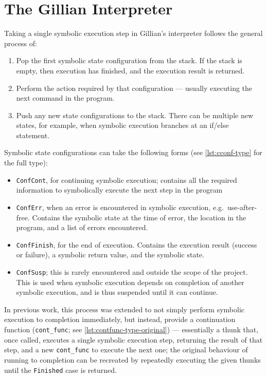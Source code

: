 \section{The Gillian Interpreter}\label{sec:current:interpreter}

Taking a single symbolic execution step in Gillian's interpreter follows the
general process of:
\begin{enumerate}
  \item Pop the first symbolic state configuration from the stack. If the stack
        is empty, then execution has finished, and the execution result is
        returned.
  \item Perform the action required by that configuration --- usually executing
        the next command in the program.
  \item Push any new state configurations to the stack. There can be multiple
        new states, for example, when symbolic execution branches at an if/else
        statement.
\end{enumerate}

Symbolic state configurations can take the following forms (see
\autoref{lst:cconf-type} for the full type):
\begin{itemize}
  \item \texttt{ConfCont}, for continuing symbolic execution; contains all the
        required information to symbolically execute the next step in the
        program
  \item \texttt{ConfErr}, when an error is encountered in symbolic execution,
        e.g.\ use-after-free. Contains the symbolic state at the time of error,
        the location in the program, and a list of errors encountered.
  \item \texttt{ConfFinish}, for the end of execution. Contains the execution
        result (success or failure), a symbolic return value, and the symbolic
        state.
  \item \texttt{ConfSusp}; this is rarely encountered and outside the scope
        of the project. This is used when symbolic execution depends on
        completion of another symbolic execution, and is thus suspended until
        it can continue.
\end{itemize}

In previous work, this process was extended to not simply perform symbolic
execution to completion immediately, but instead, provide a continuation
function (\texttt{cont\_func}; see \autoref{lst:contfunc-type-original}) ---
essentially a thunk that, once called, executes a single symbolic execution
step, returning the result of that step, and a new \texttt{cont\_func} to
execute the next one; the original behaviour of running to completion can be
recreated by repeatedly executing the given thunks until the \texttt{Finished}
case is returned.

